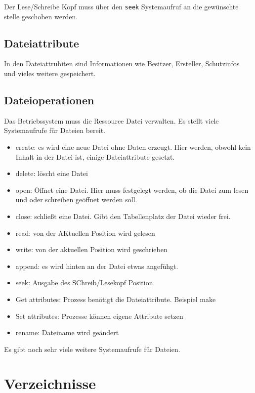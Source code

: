 Der Lese/Schreibe Kopf muss über den \texttt{seek} Systemaufruf an die gewünschte stelle geschoben werden.

\subsection{Dateiattribute}

In den Dateiattrubiten sind Informationen wie Besitzer, Ersteller, Schutzinfos und vieles weitere gespeichert. 

\subsection{Dateioperationen}

Das Betriebssystem muss die Ressource Datei verwalten. Es stellt viele Systemaufrufe für Dateien bereit.

\begin{itemize}
    \item create: es wird eine neue Datei ohne Daten erzeugt. Hier werden, obwohl kein Inhalt in der Datei ist, einige Dateiattribute gesetzt.
    \item delete: löscht eine Datei
    \item open: Öffnet eine Datei. Hier muss festgelegt werden, ob die Datei zum lesen und oder schreiben geöffnet werden soll.
    \item close: schließt eine Datei. Gibt den Tabellenplatz der Datei wieder frei.
    \item read: von der AKtuellen Position wird gelesen
    \item write: von der aktuellen Position wird geschrieben
    \item append: es wird hinten an der Datei etwas angefühgt.
    \item seek: Ausgabe des SChreib/Lesekopf Position
    \item Get attributes: Prozess benötigt die Dateiattribute. Beispiel make
    \item Set attributes: Prozesse können eigene Attribute setzen
    \item rename: Dateiname wird geändert
\end{itemize}

Es gibt noch sehr viele weitere Systemaufrufe für Dateien.

\section{Verzeichnisse}

